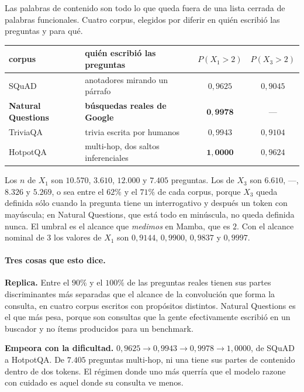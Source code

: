 \documentclass[11pt,a4paper]{article}
\begin{document}
Las palabras de contenido son todo lo que queda fuera de una lista cerrada de palabras funcionales.
Cuatro corpus, elegidos por diferir en quién escribió las preguntas y para qué.

\begin{center}
\begin{tabular}{llcc}
\toprule
corpus & quién escribió las preguntas & $P(X_1 > 2)$ & $P(X_3 > 2)$ \\
\midrule
SQuAD & anotadores mirando un párrafo & $0{,}9625$ & $0{,}9045$ \\
\textbf{Natural Questions} & \textbf{búsquedas reales de Google} & $\mathbf{0{,}9978}$ & --- \\
TriviaQA & trivia escrita por humanos & $0{,}9943$ & $0{,}9104$ \\
HotpotQA & multi-hop, dos saltos inferenciales & $\mathbf{1{,}0000}$ & $0{,}9624$ \\
\bottomrule
\end{tabular}
\end{center}

Los $n$ de $X_1$ son $10{.}570$, $3{.}610$, $12{.}000$ y $7{.}405$ preguntas. Los de $X_3$ son
$6{.}610$, ---, $8{.}326$ y $5{.}269$, o sea entre el $62\%$ y el $71\%$ de cada corpus, porque $X_3$
queda definida sólo cuando la pregunta tiene un interrogativo y después un token con mayúscula; en
Natural Questions, que está todo en minúscula, no queda definida nunca. El umbral es el alcance que
\emph{medimos} en Mamba, que es $2$. Con el alcance nominal de $3$ los valores de $X_1$ son
$0{,}9144$, $0{,}9900$, $0{,}9837$ y $0{,}9997$.

\paragraph{Tres cosas que esto dice.}

\textbf{Replica.} Entre el $90\%$ y el $100\%$ de las preguntas reales tienen sus partes
discriminantes más separadas que el alcance de la convolución que forma la consulta, en cuatro corpus
escritos con propósitos distintos. Natural Questions es el que más pesa, porque son consultas que la
gente efectivamente escribió en un buscador y no ítems producidos para un benchmark.

\textbf{Empeora con la dificultad.} $0{,}9625 \to 0{,}9943 \to 0{,}9978 \to 1{,}0000$, de SQuAD a
HotpotQA. De $7{.}405$ preguntas multi-hop, ni una tiene sus partes de contenido dentro de dos tokens.
El régimen donde uno más querría que el modelo razone con cuidado es aquel donde su consulta ve menos.
\end{document}
